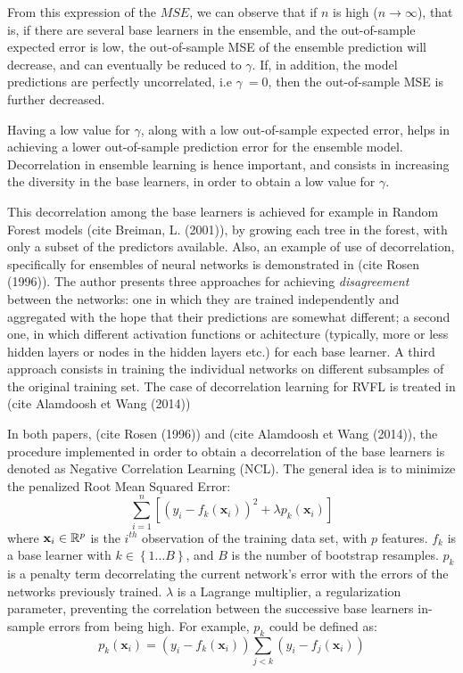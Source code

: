 From this expression of the $MSE$, we can observe that if $n$ is high ($n \rightarrow \infty$), that is, if there are several base learners in the ensemble, and the out-of-sample expected error is low, the out-of-sample MSE of the ensemble prediction will decrease, and can eventually be reduced to $\gamma$. If, in addition, the model predictions are perfectly uncorrelated, i.e $\gamma ~= 0$, then the out-of-sample MSE is further decreased.

\medskip

Having a low value for $\gamma$, along with a low out-of-sample expected error, helps in achieving a lower out-of-sample prediction error for the ensemble model. Decorrelation in ensemble learning is hence important, and consists in increasing the diversity in the base learners, in order to obtain a low value for $\gamma$.

\medskip

This decorrelation among the base learners is achieved for example in Random Forest models (cite Breiman, L. (2001)), by growing each tree in the forest, with only a subset of the predictors available. Also, an example of use of decorrelation, specifically for ensembles of neural networks is demonstrated in (cite Rosen (1996)). The author presents three approaches for achieving \textit{disagreement} between the networks: one in which they are trained independently and aggregated with the hope that their predictions are somewhat different; a second one, in which different activation functions or achitecture (typically, more or less hidden layers or nodes in the hidden layers etc.) for each base learner. A third approach consists in training the individual networks on different subsamples of the original training set. The case of decorrelation learning for RVFL is treated in (cite Alamdoosh et Wang (2014))

\medskip

In both papers, (cite Rosen (1996)) and (cite Alamdoosh et Wang (2014)), the procedure implemented in order to obtain a decorrelation of the base learners is denoted as Negative Correlation Learning (NCL). The general idea is to minimize the penalized Root Mean Squared Error:
$$
\sum_{i = 1}^n\left[\left(y_i - f_k(\textbf{x}_i)\right)^2 + \lambda p_k(\textbf{x}_i)\right]
$$
where $\textbf{x}_i \in \mathbb{R}^p$ is the $i^{th}$ observation of the training data set, with $p$ features. $f_k$ is a base learner with $k \in \left \lbrace 1 \ldots B\right \rbrace$, and $B$ is the number of bootstrap resamples. $p_k$ is a penalty term decorrelating the current network's error with the errors of the networks previously trained. $\lambda$ is a Lagrange multiplier, a regularization parameter, preventing the correlation between the successive base learners in-sample errors from being high. For example, $p_k$ could be defined as:
$$
p_k(\textbf{x}_i) = \left(y_i - f_k(\textbf{x}_i)\right)\sum_{j < k}\left(y_i - f_j(\textbf{x}_i)\right)
$$

